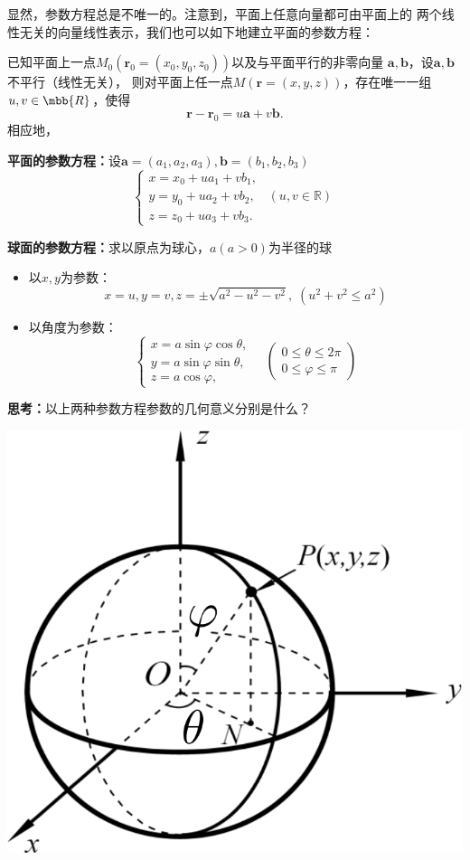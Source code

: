 显然，参数方程总是不唯一的。注意到，平面上任意向量都可由平面上的
两个线性无关的向量线性表示，我们也可以如下地建立平面的参数方程：

已知平面上一点$M_0(\bm{r}_0=(x_0,y_0,z_0))$以及与平面平行的非零向量
$\bm{a},\bm{b}$，设$\bm{a},\bm{b}$不平行（线性无关），
则对平面上任一点$M(\bm{r}=(x,y,z))$，存在唯一一组$u,v\in\mbb{R}$，使得
$$\bm{r}-\bm{r}_0=u\bm{a}+v\bm{b}.$$ 
相应地，
\begin{thx}
	{\bf 平面的参数方程：}设$\bm{a}=(a_1,a_2,a_3),\bm{b}=(b_1,b_2,b_3)$
	$${\left\{\begin{array}{l}
		x=x_0+ua_1+vb_1,\\
		y=y_0+ua_2+vb_2,\quad(u,v\in\mathbb{R})\\
		z=z_0+ua_3+vb_3.
	\end{array}\right.}$$
\end{thx}
% 
% 

{\bf 球面的参数方程：}求以原点为球心，$a(a>0)$为半径的球
\begin{itemize}
  \item {以$x,y$为参数：} 
  $${x=u,y=v,z=\pm\sqrt{a^2-u^2-v^2},\;(u^2+v^2\leq a^2)}$$
  \vspace{-2em} 
  \item {以角度为参数：} 
  $${\left\{\begin{array}{l}
  	x=a\sin\varphi\cos\theta,\\
  	y=a\sin\varphi\sin\theta,\\
  	z=a\cos\varphi,
  \end{array}\right.
  \quad\left(\begin{array}{c}
  	0\leq\theta\leq 2\pi\\
  	0\leq\varphi\leq\pi
  \end{array}\right)}$$
\end{itemize}

{\bf 思考：}以上两种参数方程参数的几何意义分别是什么？

\begin{center}
	\includegraphics[width=.4\textwidth]{./images/ch8/sphere.pdf}
\end{center}

